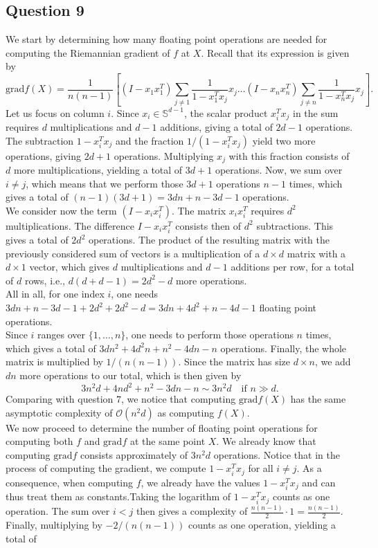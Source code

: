 \documentclass{article}
\begin{document}
\subsection*{Question 9}
We start by determining how many floating point operations are needed for computing the Riemannian gradient of $f$ at $X$. Recall that its expression is given by
$$
\text{grad}f(X) = \frac{1}{n(n-1)} \left[ (I-x_1x_1^T)\sum_{j\neq 1}\frac{1}{1-x_1^Tx_j}x_j \ldots (I-x_nx_n^T)\sum_{j\neq n}\frac{1}{1-x_n^Tx_j}x_j\right].
$$
Let us focus on column $i$. Since $x_i\in\mathbb{S}^{d-1}$, the scalar product $x_i^Tx_j$ in the sum requires $d$ multiplications and $d-1$ additions, giving a total of $2d-1$ operations. The subtraction $1-x_i^Tx_j$ and the fraction $1/(1-x_i^Tx_j)$ yield two more operations, giving $2d+1$ operations. Multiplying $x_j$ with this fraction consists of $d$ more multiplications, yielding a total of $3d+1$ operations. Now, we sum over $i\neq j$, which means that we perform those $3d+1$ operations $n-1$ times, which gives a total of $(n-1)(3d+1) = 3dn + n - 3d -1$ operations.\\
We consider now the term $(I-x_ix_i^T)$. The matrix $x_ix_i^T$ requires $d^2$ multiplications. The difference $I - x_ix_i^T$ consists then of $d^2$ subtractions. This gives a total of $2d^2$ operations. The product of the resulting matrix with the previously considered sum of vectors is a multiplication of a $d\times d$ matrix with a $d\times 1$ vector, which gives $d$ multiplications and $d-1$ additions per row, for a total of $d$ rows, i.e., $d(d+d-1) = 2d^2-d$ more operations.\\
All in all, for one index $i$, one needs $3dn+n-3d-1+2d^2+2d^2-d = 3dn + 4d^2+n-4d-1$ floating point operations.\\
Since $i$ ranges over $\{1, \ldots, n\}$, one needs to perform those operations $n$ times, which gives a total of $3dn^2+4d^2n+n^2-4dn-n$ operations. Finally, the whole matrix is multiplied by $1/(n(n-1))$. Since the matrix has size $d\times n$, we add $dn$ more operations to our total, which is then given by
$$
3n^2d+4nd^2+n^2-3dn-n \sim 3n^2d \text{ }\text{ if }n\gg d.
$$
Comparing with question $7$, we notice that computing $\text{grad}f(X)$ has the same asymptotic complexity of $\mathcal{O}(n^2d)$ as computing $f(X)$.\\
\newline
We now proceed to determine the number of floating point operations for computing both $f$ and $\text{grad}f$ at the same point $X$. We already know that computing $\text{grad}f$ consists approximately of $3n^2d$ operations. Notice that in the process of computing the gradient, we compute $1-x_i^Tx_j$ for all $i\neq j$. As a consequence, when computing $f$, we already have the values $1-x_i^Tx_j$ and can thus treat them as constants.Taking the logarithm of $1-x_i^Tx_j$ counts as one operation. The sum over $i<j$ then gives a complexity of $\frac{n(n-1)}{2}\cdot 1 = \frac{n(n-1)}{2}$. Finally, multiplying by $-2/(n(n-1))$ counts as one operation, yielding a total of
\end{document}
